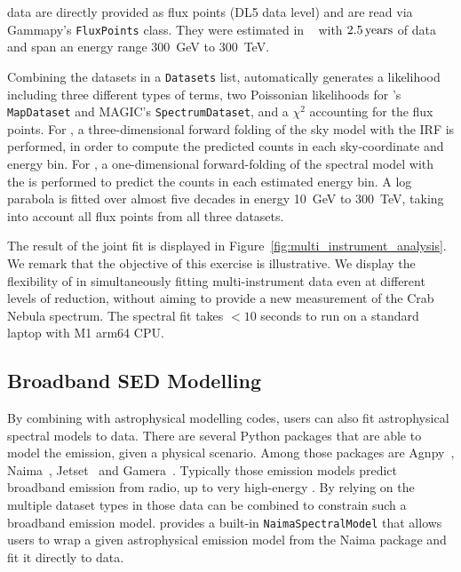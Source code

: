 \documentclass[longauth]{aa}
\newcommand{\code}[1]{\texttt{#1}}
\begin{document}
\hawc data are directly provided as flux points (DL5 data level) and are read
via Gammapy's \code{FluxPoints} class. They were estimated in ~\cite{hawc_crab_2019}
with $2.5\,{\rm years}$ of data and span an energy range \SI{300}{GeV} to \SI{300}{TeV}.

Combining the datasets in a \code{Datasets} list, \gammapy automatically generates
a likelihood including three different types of terms, two Poissonian likelihoods
for \fermi's \code{MapDataset} and MAGIC's \code{SpectrumDataset}, and a $\chi^2$
accounting for the \hawc flux points. For \fermi, a three-dimensional forward folding
of the sky model with the IRF is performed, in order to compute the predicted counts
in each sky-coordinate and energy bin. For \magic, a one-dimensional forward-folding
of the spectral model with the \irfs is performed to predict the counts in each estimated energy bin. A log
parabola is fitted over almost five decades in energy \SI{10}{GeV} to \SI{300}{TeV}, taking into account all flux points from all three datasets.

The result of the joint fit is displayed in
Figure~\ref{fig:multi_instrument_analysis}. We remark that the objective of this
exercise is illustrative. We display the flexibility of \gammapy in
simultaneously fitting multi-instrument data even at different levels of
reduction, without aiming to provide a new measurement of the Crab Nebula
spectrum. The spectral fit takes $<10$ seconds to run on a standard laptop with M1 arm64 CPU.


\subsection{Broadband SED Modelling}
\label{ssec:broadband-sed-modeling}
By combining \gammapy with astrophysical modelling codes, users can also fit
astrophysical spectral models to \gammaray data. 
There are several Python packages that are able to model
the \gammaray emission, given a physical scenario. Among those
packages are Agnpy~\citep{agnpy2022}, Naima~\citep{naima}, Jetset~\citep{jetset}
and Gamera~\citep{gamera}.
Typically those emission models predict broadband emission from
radio, up to very high-energy \gammarays.
By relying on the multiple dataset types in \gammapy those
data can be combined to constrain such a broadband emission model.
\gammapy provides a built-in \code{NaimaSpectralModel} that allows
users to wrap a given astrophysical emission model from the
Naima package and fit it directly to \gammaray data.
\end{document}
